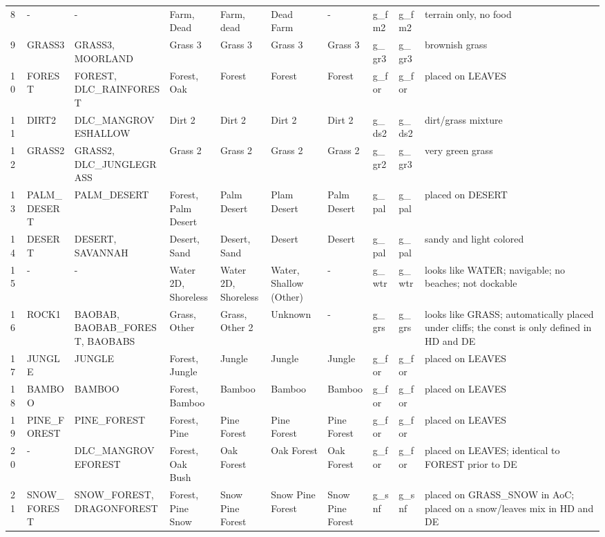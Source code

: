 \begin{appendices}
\begin{landscape}
\begin{longtable}{@{}p{5mm}|p{25mm}p{23mm}|p{14mm}p{14mm}p{14mm}p{14mm}|p{10mm}p{15mm}|p{45mm}@{}}
            8	& -	& -	& Farm, Dead	& Farm, dead	& Dead Farm	& -	& g\_fm2	& g\_fm2		& terrain only, no food \\
            9	& GRASS3	& GRASS3, MOORLAND	& Grass 3	& Grass 3	& Grass 3	& Grass 3	& g\_gr3	& g\_gr3		& brownish grass \\
            10	& FOREST	& FOREST, DLC\_RAINFOREST	& Forest, Oak	& Forest	& Forest	& Forest	& g\_for	& g\_for		& placed on LEAVES \\
            11	& DIRT2	& DLC\_MANGROVESHALLOW	& Dirt 2	& Dirt 2	& Dirt 2	& Dirt 2	& g\_ds2	& g\_ds2		& dirt/grass mixture \\
            12	& GRASS2	& GRASS2, DLC\_JUNGLEGRASS	& Grass 2	& Grass 2	& Grass 2	& Grass 2	& g\_gr2	& g\_gr3		& very green grass \\
            13	& PALM\_DESERT	& PALM\_DESERT	& Forest, Palm Desert	& Palm Desert	& Plam Desert	& Palm Desert	& g\_pal	& g\_pal		& placed on DESERT \\
            14	& DESERT	& DESERT, SAVANNAH	& Desert, Sand	& Desert, Sand	& Desert	& Desert	& g\_pal	& g\_pal		& sandy and light colored \\
            15	& -	& -	& Water 2D, Shoreless	& Water 2D, Shoreless	& Water, Shallow (Other)	& -	& g\_wtr	& g\_wtr		& looks like WATER; navigable; no beaches; not dockable \\
            16	& ROCK1	& BAOBAB, BAOBAB\_FOREST, BAOBABS	& Grass, Other	& Grass, Other 2	& Unknown	& -	& g\_grs	& g\_grs		& looks like GRASS; automatically placed under cliffs; the const is only defined in HD and DE \\
            17	& JUNGLE	& JUNGLE	& Forest, Jungle	& Jungle	& Jungle	& Jungle	& g\_for	& g\_for		& placed on LEAVES \\
            18	& BAMBOO	& BAMBOO	& Forest, Bamboo	& Bamboo	& Bamboo	& Bamboo	& g\_for	& g\_for		& placed on LEAVES \\
            19	& PINE\_FOREST	& PINE\_FOREST	& Forest, Pine	& Pine Forest	& Pine Forest	& Pine Forest	& g\_for	& g\_for		& placed on LEAVES \\
            20	& -	& DLC\_MANGROVEFOREST	& Forest, Oak Bush	& Oak Forest	& Oak Forest	& Oak Forest	& g\_for	& g\_for		& placed on LEAVES; identical to FOREST prior to DE \\
            21	& SNOW\_FOREST	& SNOW\_FOREST, DRAGONFOREST	& Forest, Pine Snow	& Snow Pine Forest	& Snow Pine Forest	& Snow Pine Forest	& g\_snf	& g\_snf		& placed on GRASS\_SNOW in AoC; placed on a snow/leaves mix in HD and DE \\

\end{longtable}
\end{landscape}
\end{appendices}
